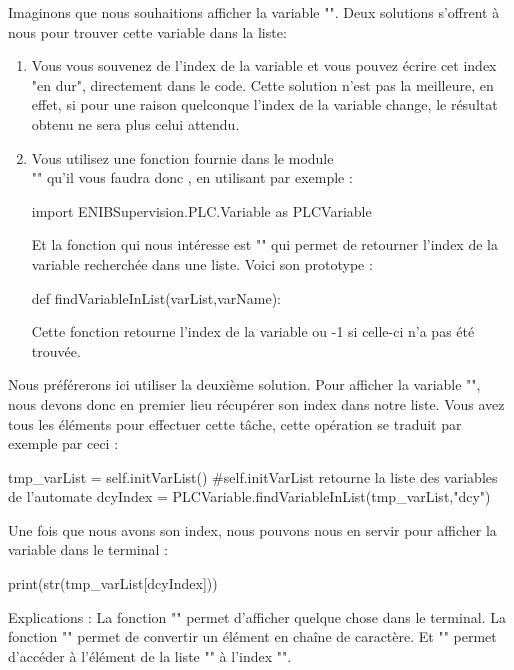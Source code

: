 {Imaginons que nous souhaitions afficher la variable "". Deux solutions s'offrent à nous pour trouver cette variable dans la liste:
\begin{enumerate}
\item Vous vous souvenez de l'index de la variable et vous pouvez écrire cet index "en dur", directement dans le code. Cette solution n'est pas la meilleure, en effet, si pour une raison quelconque l'index de la variable change, le résultat obtenu ne sera plus celui attendu.

\item Vous utilisez une fonction fournie dans le module \\ "" qu'il vous faudra donc , en utilisant par exemple :
\begin{Python}
import ENIBSupervision.PLC.Variable as PLCVariable
\end{Python}
Et la fonction qui nous intéresse est "" qui permet de retourner l'index de la variable recherchée dans une liste. Voici son prototype :
\begin{Python}
def findVariableInList(varList,varName):
\end{Python}
Cette fonction retourne l'index de la variable ou -1 si celle-ci n'a pas été trouvée.
\end{enumerate}


Nous préférerons ici utiliser la deuxième solution. Pour afficher la variable "", nous devons donc en premier lieu récupérer son index dans notre liste. Vous avez tous les éléments pour effectuer cette tâche, cette opération se traduit par exemple par ceci :
\begin{Python}
tmp_varList = self.initVarList()
#self.initVarList retourne la liste des variables de l'automate
dcyIndex = PLCVariable.findVariableInList(tmp_varList,"dcy")
\end{Python}
Une fois que nous avons son index, nous pouvons nous en servir pour afficher la variable dans le terminal :
\begin{Python}
print(str(tmp_varList[dcyIndex]))
\end{Python}
Explications :\newline
La fonction "" permet d'afficher quelque chose dans le terminal.\newline
La fonction "" permet de convertir un élément en chaîne de caractère.\newline
Et "" permet d'accéder à l'élément de la liste "" à l'index "".\\





}
